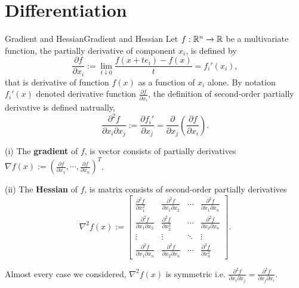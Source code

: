 \section{Differentiation}
\begin{definition}{Gradient and Hessian}{Gradient and Hessian}
    Let $f:\mathbb{R}^n\to \mathbb{R}$ be a multivariate function, the partially derivative of component $x_i$, is defined by 
    \begin{equation*}
        \frac{\partial f}{\partial x_i}:=\lim\limits_{t\downarrow 0}\dfrac{f(x + te_i)-f(x)}{t} = f_{i}'(x_i),
    \end{equation*}
    that is derivative of function $f(x)$ as a function of $x_i$ alone. By notation $f_{i}'(x)$ denoted derivative function $\frac{\partial f}{\partial x_i}$, the definition of second-order partially derivative is defined natrually,
    \begin{equation*}
        \dfrac{\partial^2 f}{\partial x_i\partial x_j} := \dfrac{\partial f_i'}{\partial x_j} = \dfrac{\partial }{\partial x_j}\left(\dfrac{\partial f}{\partial x_i}\right).
    \end{equation*}

    (i) The \textbf{gradient} of $f$, is vector consists of partially derivatives $\nabla f(x):= (\frac{\partial f}{\partial x_1},\cdots,\frac{\partial f}{\partial x_n})^T$.

    (ii) The \textbf{Hessian} of $f$, is matrix consists of second-order partially derivatives
    \begin{equation*}
        \nabla^2f(x):=\begin{bmatrix}
            \frac{\partial^2 f}{\partial x_1^2}&\frac{\partial^2 f}{\partial x_1\partial x_2}&\cdots&\frac{\partial^2 f}{\partial x_1\partial x_n}\\
            \frac{\partial^2 f}{\partial x_1\partial x_2}&\frac{\partial^2 f}{\partial x_2^2}&\cdots&\frac{\partial^2 f}{\partial x_2\partial x_n}\\
            \vdots&\vdots&\ddots&\vdots\\
            \frac{\partial^2 f}{\partial x_1\partial x_n}&\frac{\partial^2 f}{\partial x_2\partial x_n}&\cdots&\frac{\partial^2 f}{\partial x_n^2}
        \end{bmatrix}.
    \end{equation*}
\end{definition}
\begin{remark}
    Almost every case we considered, $\nabla^2 f(x)$ is symmetric i.e. $\frac{\partial^2 f}{\partial x_i\partial x_j}=\frac{\partial^2 f}{\partial x_j\partial x_i}$.
\end{remark}

